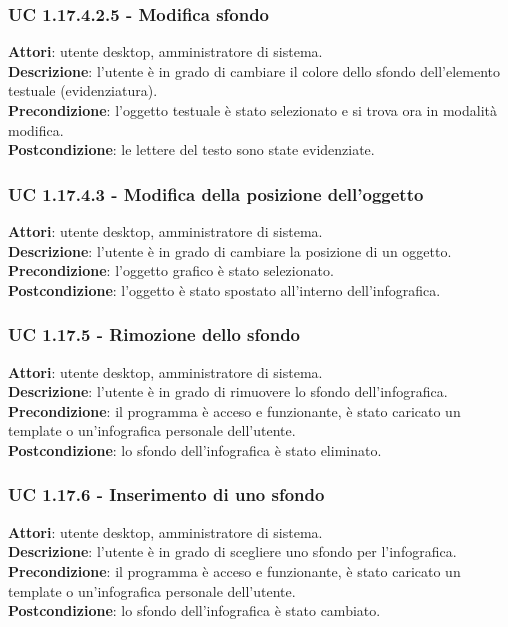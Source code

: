 \subsubsection{UC 1.17.4.2.5 - Modifica sfondo}{
	\label{uc1.17.4.2.5}
	\textbf{Attori}: utente desktop, amministratore di sistema. \\
	\textbf{Descrizione}: l'utente è in grado di cambiare il colore dello sfondo dell’elemento testuale (evidenziatura). \\
	\textbf{Precondizione}: l'oggetto testuale è stato selezionato e si trova ora in modalità modifica.\\
	\textbf{Postcondizione}: le lettere del testo sono state evidenziate.	\\
	}
\subsubsection{UC 1.17.4.3 - Modifica della posizione dell'oggetto}{
	\label{uc1.17.4.3}
	\textbf{Attori}: utente desktop, amministratore di sistema. \\
	\textbf{Descrizione}: l'utente è in grado di cambiare la posizione di un oggetto. \\
	\textbf{Precondizione}: l'oggetto grafico è stato selezionato.\\
	\textbf{Postcondizione}: l'oggetto è stato spostato all’interno dell’infografica.	\\
	}
\subsubsection{UC 1.17.5 - Rimozione dello sfondo}{
	\label{uc1.17.5}
	\textbf{Attori}: utente desktop, amministratore di sistema. \\
	\textbf{Descrizione}: l'utente è in grado di rimuovere lo sfondo dell’infografica. \\
	\textbf{Precondizione}: il programma è acceso e funzionante, è stato caricato un template o un'infografica personale dell'utente.	\\
	\textbf{Postcondizione}: lo sfondo dell'infografica è stato eliminato.	\\
	}
\subsubsection{UC 1.17.6 - Inserimento di uno sfondo}{
	\label{uc1.17.6}
	\textbf{Attori}: utente desktop, amministratore di sistema. \\
	\textbf{Descrizione}: l'utente è in grado di scegliere uno sfondo per l'infografica. \\
	\textbf{Precondizione}: il programma è acceso e funzionante, è stato caricato un template o un'infografica personale dell'utente.	\\
	\textbf{Postcondizione}: lo sfondo dell'infografica è stato cambiato.	\\
	}
